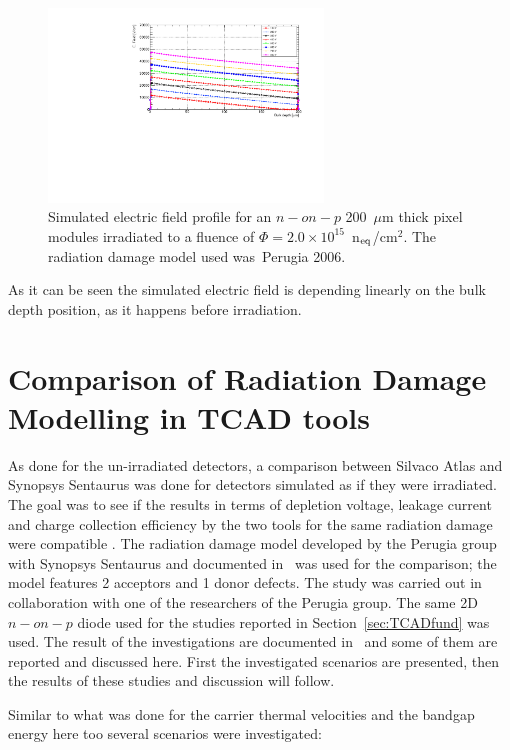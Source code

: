 \begin{figure}[!htpb]
\centering
\includegraphics[width=0.65\textwidth]{EField_Natascha_fl2e15_Petasecca.pdf}
\caption{\label{fig:EField_Profile_Perugia2006}Simulated electric field profile for an $n-on-p$ 200~$\mu$m thick pixel modules irradiated to a fluence of 
$\Phi = 2.0\times10^{15}$~n$_{\rm eq}$/cm$^2$. The radiation damage model used was~Perugia 2006\cite{Moscatelli-2006}.}
\end{figure}
As it can be seen the simulated electric field is depending linearly on the bulk depth position, 
as it happens before irradiation. 

\section{Comparison of Radiation Damage Modelling in TCAD tools}
\label{sec:TCADComparison}
As done for the un-irradiated detectors, a comparison between Silvaco Atlas and Synopsys Sentaurus 
was done for detectors simulated as if they were irradiated. The goal was to see if the results in terms of 
depletion voltage, leakage current and charge collection efficiency  by the two tools for 
the same radiation damage were 
compatible . 
The radiation damage model developed by the Perugia group with 
Synopsys Sentaurus and documented in~\cite{PASSERI2016443} was 
used for the comparison; the model features 2 acceptors and 1 donor defects. The study was carried out in collaboration with one of  the 
researchers of the Perugia group. 
The same 2D $n-on-p$ diode used for the studies reported in 
Section~\ref{sec:TCADfund} was used.
The result of the investigations are documented in~\cite{bomben_rd50_Torino} and some of them 
are reported and discussed here. First the investigated scenarios are presented, then the results of these 
studies and discussion will follow.

Similar to what was done for the carrier thermal  velocities and the bandgap energy here too several 
scenarios were investigated: 

